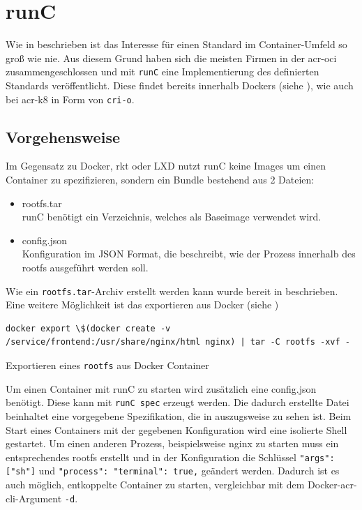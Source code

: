 \section{runC}
\label{sec:comprunC}

Wie in  beschrieben ist das Interesse für einen Standard im Container-Umfeld so groß wie nie. Aus diesem Grund haben sich die meisten Firmen in der \gls{acr-oci} zusammengeschlossen und mit \texttt{runC} eine Implementierung des definierten Standards veröffentlicht. Diese findet bereits innerhalb Dockers (siehe ), wie auch bei \gls{acr-k8} in Form von \texttt{cri-o}.

\subsection{Vorgehensweise}
\label{sec:comprunCVorgehen}

Im Gegensatz zu Docker, rkt oder LXD nutzt runC keine Images um einen Container zu spezifizieren, sondern ein Bundle bestehend aus 2 Dateien:
\begin{itemize}
	\item rootfs.tar \\
	runC benötigt ein Verzeichnis, welches als Baseimage verwendet wird.
	\item config.json \\
	Konfiguration im JSON Format, die beschreibt, wie der Prozess innerhalb des rootfs ausgeführt werden soll.
\end{itemize}

Wie ein \texttt{rootfs.tar}-Archiv erstellt werden kann wurde bereit in  beschrieben. Eine weitere Möglichkeit ist das exportieren aus Docker (siehe )

\begin{listing}[h]
	\begin{verbatim}
docker export \$(docker create -v /service/frontend:/usr/share/nginx/html nginx) | tar -C rootfs -xvf -
	\end{verbatim}
	\caption{Exportieren eines \texttt{rootfs} aus Docker Container}
	\label{lst:dockerExport}
\end{listing}

Um einen Container mit runC zu starten wird zusätzlich eine config.json benötigt. Diese kann mit \texttt{runC spec} erzeugt werden. Die dadurch erstellte Datei beinhaltet eine vorgegebene Spezifikation, die in  auszugsweise zu sehen ist. Beim Start eines Containers mit der gegebenen Konfiguration wird eine isolierte Shell gestartet. Um einen anderen Prozess, beispielsweise nginx zu starten muss ein entsprechendes rootfs erstellt und in der Konfiguration die Schlüssel \texttt{{"args": ["sh"]}} und \texttt{{"process": {"terminal": true,}}} geändert werden. Dadurch ist es auch möglich, entkoppelte Container zu starten, vergleichbar mit dem Docker-\gls{acr-cli}-Argument \texttt{-d}. 

